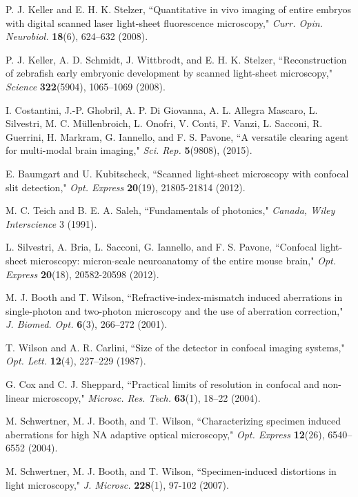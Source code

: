 \documentclass[12pt]{spieman}  %
\begin{document}
\begin{spacing}{2}
\begin{thebibliography}{0}
 P. J. Keller and E. H. K. Stelzer, ``Quantitative in vivo imaging of entire embryos with digital scanned laser light-sheet fluorescence microscopy," \emph{Curr. Opin. Neurobiol.} \textbf{18}(6), 624–632 (2008).

 P. J. Keller, A. D. Schmidt, J. Wittbrodt, and E. H. K. Stelzer, ``Reconstruction of zebrafish early embryonic development by scanned light-sheet microscopy," \emph{Science} \textbf{322}(5904), 1065–1069 (2008).

 I. Costantini, J.-P. Ghobril, A. P. Di Giovanna, A. L. Allegra Mascaro, L. Silvestri, M. C. M\"{u}llenbroich, L. Onofri, V. Conti, F. Vanzi, L. Sacconi, R. Guerrini, H. Markram, G. Iannello, and F. S. Pavone, ``A versatile clearing agent for multi-modal brain imaging," \emph{Sci. Rep.} \textbf{5}(9808), (2015).

 E. Baumgart and U. Kubitscheck, ``Scanned light-sheet microscopy with confocal slit detection," \emph{Opt. Express} \textbf{20}(19), 21805-21814 (2012).

 M. C. Teich and B. E. A. Saleh, ``Fundamentals of photonics," \emph{Canada, Wiley Interscience} 3 (1991).

 L. Silvestri, A. Bria, L. Sacconi, G. Iannello,  and F. S. Pavone,  ``Confocal light-sheet microscopy: micron-scale neuroanatomy of the entire mouse brain," \emph{Opt. Express} \textbf{20}(18), 20582-20598 (2012).

 M. J. Booth and T. Wilson, ``Refractive-index-mismatch induced aberrations in single-photon and two-photon microscopy and the use of aberration correction," \emph{J. Biomed. Opt.} \textbf{6}(3), 266–272 (2001).

 T. Wilson and A. R. Carlini, ``Size of the detector in confocal imaging systems," \emph{Opt. Lett.} \textbf{12}(4), 227–229 (1987).

 G. Cox and C. J. Sheppard, ``Practical limits of resolution in confocal and non-linear microscopy," \emph{Microsc. Res. Tech.} \textbf{63}(1), 18–22 (2004).

 M. Schwertner, M. J. Booth, and T. Wilson, ``Characterizing specimen induced aberrations for high NA adaptive optical microscopy," \emph{Opt. Express} \textbf{12}(26), 6540–6552 (2004).

 M. Schwertner, M. J. Booth, and T. Wilson, ``Specimen‐induced distortions in light microscopy," \emph{J. Microsc.} \textbf{228}(1), 97-102 (2007).


\end{thebibliography}
\end{spacing}
\end{document}
